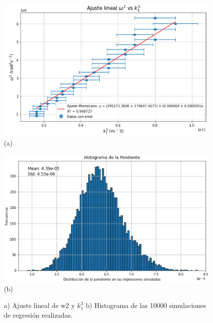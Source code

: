 \clearpage
\begin{figure}[H]
	\centering
	\begin{minipage}{0.465\textwidth} 
		\includegraphics[width=\textwidth]{grafico_02x04_w2k13.png}
		\centering(a)
	\end{minipage}
	\hspace{0.5cm}
	\begin{minipage}{0.485\textwidth} 
		\includegraphics[width=1\textwidth]{grafico_02x05_w2k13hist.png}
		\centering (b)
	\end{minipage}
	\caption{ \footnotesize {a) Ajuste lineal de w2 y $k_1^3$  b) Histograma de las 10000 simulaciones de regresión realizadas.}}
	\label{fig:w2k1}
\end{figure}

